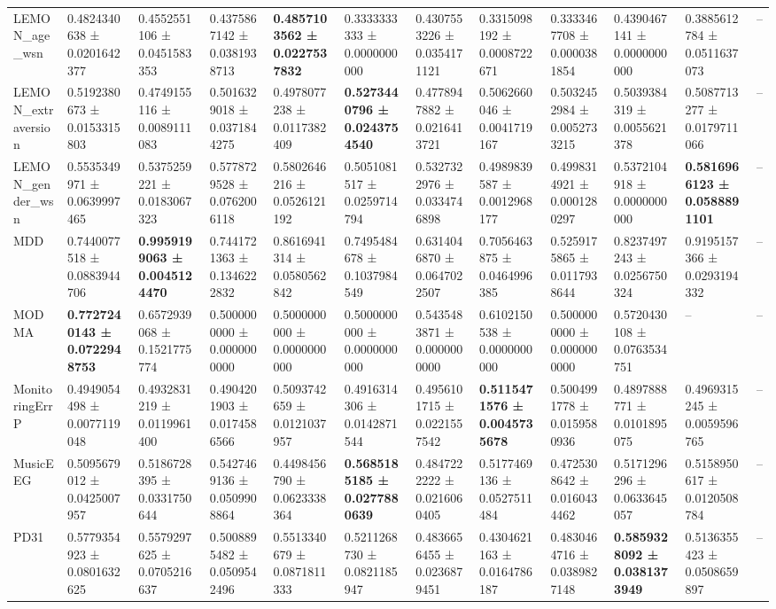 \begin{table}[htbp]
\begin{tabular}{llllllllllll}
LEMON_age_wsn & 0.4824340638 ± 0.0201642377 & 0.4552551106 ± 0.0451583353 & 0.4375867142 ± 0.0381938713 & \bfseries 0.4857103562 ± 0.0227537832 & 0.3333333333 ± 0.0000000000 & 0.4307553226 ± 0.0354171121 & 0.3315098192 ± 0.0008722671 & 0.3333467708 ± 0.0000381854 & 0.4390467141 ± 0.0000000000 & 0.3885612784 ± 0.0511637073 & -- \\
LEMON_extraversion & 0.5192380673 ± 0.0153315803 & 0.4749155116 ± 0.0089111083 & 0.5016329018 ± 0.0371844275 & 0.4978077238 ± 0.0117382409 & \bfseries 0.5273440796 ± 0.0243754540 & 0.4778947882 ± 0.0216413721 & 0.5062660046 ± 0.0041719167 & 0.5032452984 ± 0.0052733215 & 0.5039384319 ± 0.0055621378 & 0.5087713277 ± 0.0179711066 & -- \\
LEMON_gender_wsn & 0.5535349971 ± 0.0639997465 & 0.5375259221 ± 0.0183067323 & 0.5778729528 ± 0.0762006118 & 0.5802646216 ± 0.0526121192 & 0.5051081517 ± 0.0259714794 & 0.5327322976 ± 0.0334746898 & 0.4989839587 ± 0.0012968177 & 0.4998314921 ± 0.0001280297 & 0.5372104918 ± 0.0000000000 & \bfseries 0.5816966123 ± 0.0588891101 & -- \\
MDD & 0.7440077518 ± 0.0883944706 & \bfseries 0.9959199063 ± 0.0045124470 & 0.7441721363 ± 0.1346222832 & 0.8616941314 ± 0.0580562842 & 0.7495484678 ± 0.1037984549 & 0.6314046870 ± 0.0647022507 & 0.7056463875 ± 0.0464996385 & 0.5259175865 ± 0.0117938644 & 0.8237497243 ± 0.0256750324 & 0.9195157366 ± 0.0293194332 & -- \\
MODMA & \bfseries 0.7727240143 ± 0.0722948753 & 0.6572939068 ± 0.1521775774 & 0.5000000000 ± 0.0000000000 & 0.5000000000 ± 0.0000000000 & 0.5000000000 ± 0.0000000000 & 0.5435483871 ± 0.0000000000 & 0.6102150538 ± 0.0000000000 & 0.5000000000 ± 0.0000000000 & 0.5720430108 ± 0.0763534751 & -- & -- \\
MonitoringErrP & 0.4949054498 ± 0.0077119048 & 0.4932831219 ± 0.0119961400 & 0.4904201903 ± 0.0174586566 & 0.5093742659 ± 0.0121037957 & 0.4916314306 ± 0.0142871544 & 0.4956101715 ± 0.0221557542 & \bfseries 0.5115471576 ± 0.0045735678 & 0.5004991778 ± 0.0159580936 & 0.4897888771 ± 0.0101895075 & 0.4969315245 ± 0.0059596765 & -- \\
MusicEEG & 0.5095679012 ± 0.0425007957 & 0.5186728395 ± 0.0331750644 & 0.5427469136 ± 0.0509908864 & 0.4498456790 ± 0.0623338364 & \bfseries 0.5685185185 ± 0.0277880639 & 0.4847222222 ± 0.0216060405 & 0.5177469136 ± 0.0527511484 & 0.4725308642 ± 0.0160434462 & 0.5171296296 ± 0.0633645057 & 0.5158950617 ± 0.0120508784 & -- \\
PD31 & 0.5779354923 ± 0.0801632625 & 0.5579297625 ± 0.0705216637 & 0.5008895482 ± 0.0509542496 & 0.5513340679 ± 0.0871811333 & 0.5211268730 ± 0.0821185947 & 0.4836656455 ± 0.0236879451 & 0.4304621163 ± 0.0164786187 & 0.4830464716 ± 0.0389827148 & \bfseries 0.5859328092 ± 0.0381373949 & 0.5136355423 ± 0.0508659897 & -- \\

\end{tabular}
\end{table}
